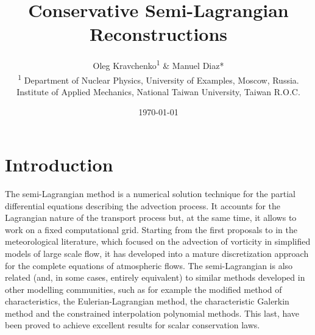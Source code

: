 \documentclass[10pt,a4paper]{article}
\begin{document}
\title{Conservative Semi-Lagrangian Reconstructions}
\author{Oleg Kravchenko\textsuperscript{1} \& Manuel Diaz* \\ 
\small \textsuperscript{1} Department of Nuclear Physics, University of Examples, Moscow, Russia. \\[-3mm]
\small * Institute of Applied Mechanics, National Taiwan University, Taiwan R.O.C.}
\date{\today}

\maketitle


\section{Introduction}

%
%
%
%

The semi-Lagrangian method is a numerical solution technique for the partial differential equations describing the advection process. It accounts for the Lagrangian nature of the transport process but, at the same time, it allows to work on a fixed computational grid. Starting from the first proposals to in the meteorological literature, which focused on the advection of vorticity in simplified models of large scale flow, it has developed into a mature discretization approach for the complete equations of atmospheric flows. The semi-Lagrangian is also related (and, in some cases, entirely equivalent) to similar methods developed in other modelling communities, such as for example the modified method of characteristics, the Eulerian-Lagrangian method, the characteristic Galerkin method and the constrained interpolation polynomial methods. This last, have been proved to achieve excellent results for scalar conservation laws.
%
\end{document}
